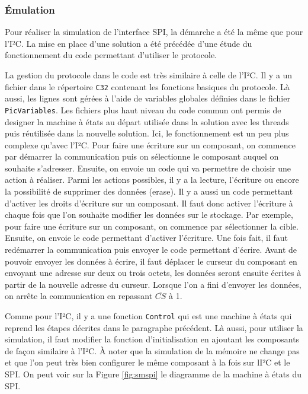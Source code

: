 \documentclass[a4paper]{article}
\begin{document}
\subsubsection*{Émulation}

Pour réaliser la simulation de l'interface SPI, la démarche a été la même que
pour l'I²C. La mise en place d'une solution a été précédée d'une étude du
fonctionnement du code permettant d'utiliser le protocole.

La gestion du protocole dans le code est très similaire à celle de l'I²C. Il y a
un fichier dans le répertoire \verb|C32| contenant les fonctions basiques
du protocole. Là aussi, les lignes sont gérées à l'aide de variables globales
définies dans le fichier \verb|PicVariables|. Les fichiers plus haut niveau
du code commun ont permis de designer la machine à états au départ utilisée dans
la solution avec les threads puis réutilisée dans la nouvelle solution. Ici, le
fonctionnement est un peu plus complexe qu'avec l'I²C. Pour faire une écriture
sur un composant, on commence par démarrer la communication puis on sélectionne
le composant auquel on souhaite s'adresser. Ensuite, on envoie un code qui va
permettre de choisir une action à réaliser. Parmi les actions possibles, il y a
la lecture, l'écriture ou encore la possibilité de supprimer des données
(erase). Il y a aussi un code permettant d'activer les droits d'écriture sur un
composant. Il faut donc activer l'écriture à chaque fois que l'on souhaite
modifier les données sur le stockage. Par exemple, pour faire une écriture sur
un composant, on commence par sélectionner la cible. Ensuite, on envoie le code
permettant d'activer l'écriture. Une fois fait, il faut redémarrer la
communication puis envoyer le code permettant d'écrire. Avant de pouvoir envoyer
les données à écrire, il faut déplacer le curseur du composant en envoyant une
adresse sur deux ou trois octets, les données seront ensuite écrites à partir de
la nouvelle adresse du curseur. Lorsque l'on a fini d'envoyer les données, on
arrête la communication en repassant $\overline{CS}$ à 1.

Comme pour l'I²C, il y a une fonction \verb|Control| qui est une machine à états
qui reprend les étapes décrites dans le paragraphe précédent. Là aussi, pour
utiliser la simulation, il faut modifier la fonction d'initialisation en
ajoutant les composants de façon similaire à l'I²C. À noter que la simulation de
la mémoire ne change pas et que l'on peut très bien configurer le même composant
à la fois sur lI²C et le SPI. On peut voir sur la Figure \ref{fig:smspi} le
diagramme de la machine à états du SPI.
\end{document}

